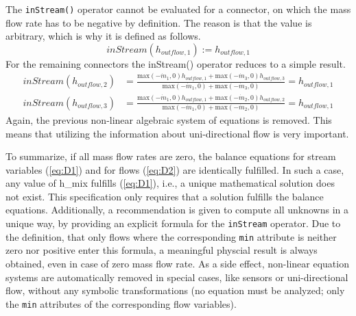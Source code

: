 The \lstinline!inStream()! operator cannot be evaluated for a connector, on which
the mass flow rate has to be negative by definition. The reason is that
the value is arbitrary, which is why it is defined as follows.
\begin{equation*}
inStream(h_{outflow,1}):=h_{outflow,1}
\end{equation*}
For the remaining connectors the inStream() operator reduces to a simple
result.
\begin{eqnarray*}
inStream(h_{outflow,2})&=\frac{\text{max}(-\dot{m}_1,0)h_{outflow,1}+\text{max}(-\dot{m}_3,0)h_{outflow,3}}{\text{max}(-\dot{m}_1,0)+\text{max}(-\dot{m}_3,0)}=h_{outflow,1}\\
inStream(h_{outflow,3})&=\frac{\text{max}(-\dot{m}_1,0)h_{outflow,1}+\text{max}(-\dot{m}_2,0)h_{outflow,2}}{\text{max}(-\dot{m}_1,0)+\text{max}(-\dot{m}_2,0)}=h_{outflow,1}
\end{eqnarray*}
Again, the previous non-linear algebraic system of equations is removed.
This means that utilizing the information about uni-directional flow is
very important.

To summarize, if all mass flow rates are zero, the balance equations for
stream variables (\ref{eq:D1}) and for flows (\ref{eq:D2}) are identically fulfilled. In
such a case, any value of h\_mix fulfills (\ref{eq:D1}), i.e., a unique
mathematical solution does not exist. This specification only requires
that a solution fulfills the balance equations. Additionally, a
recommendation is given to compute all unknowns in a unique way, by
providing an explicit formula for the \lstinline!inStream! operator. Due to the
definition, that only flows where the corresponding \lstinline!min! attribute is
neither zero nor positive enter this formula, a meaningful physcial
result is always obtained, even in case of zero mass flow rate. As a
side effect, non-linear equation systems are automatically removed in
special cases, like sensors or uni-directional flow, without any
symbolic transformations (no equation must be analyzed; only the
\lstinline!min! attributes of the corresponding flow variables).
